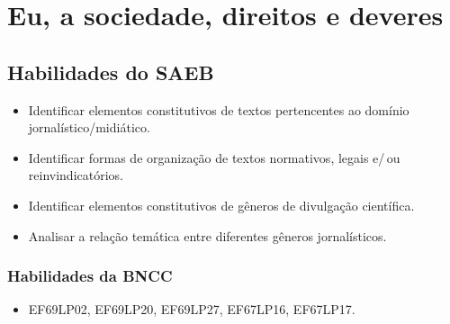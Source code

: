 
\chapter{Eu, a sociedade, direitos e deveres}

\section*{Habilidades do SAEB}
\begin{itemize}
\item Identificar elementos constitutivos de textos pertencentes ao domínio jornalístico/midiático.
\item Identificar formas de organização de textos normativos, legais e/\,ou reinvindicatórios.
\item Identificar elementos constitutivos de gêneros de divulgação científica.
\item Analisar a relação temática entre diferentes gêneros jornalísticos.
\end{itemize}

\subsection*{Habilidades da BNCC} 
\begin{itemize}
\item EF69LP02, EF69LP20, EF69LP27, EF67LP16, EF67LP17.
\end{itemize}

